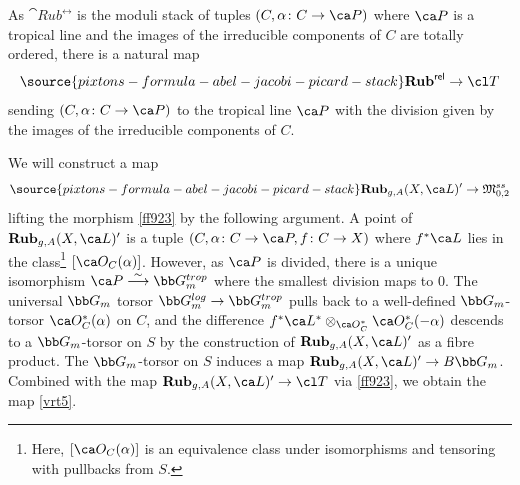 As $\cat{Rub}^{\rel}$ is the moduli stack of tuples $(C, \alpha\colon C \to \ca P)$ where $\ca P$ is a tropical line and the images of the irreducible components of $C$ are totally ordered, there is a natural map
\begin{equation}\label{ff923}
\source{pixtons-formula-abel-jacobi-picard-stack}
\cat{Rub}^{\rel} \to \cl T
\end{equation}
sending $(C, \alpha\colon C \to \ca P)$ to the tropical line $\ca P$ with the division given by the images of the irreducible components of $C$.


We will construct a map
 \begin{equation}\label{vrt5}
\source{pixtons-formula-abel-jacobi-picard-stack}
 \cat{Rub}_{g,A}(X, \ca L)'\to \frak M_{0,2}^{ss}
 \end{equation}
 lifting the  morphism \eqref{ff923} by the following argument.
A point of $\cat{Rub}_{g,A}(X, \ca L)'$ is a tuple $(C, \alpha\colon C \to \ca P, f\colon C \to X)$ where $f^*\ca L$ lies in the class{\footnote{Here,
$[\ca O_C(\alpha)]$
 is an equivalence class under isomorphisms and tensoring with pullbacks from $S$.
}}
$[\ca O_C(\alpha)]$.  However, as $\ca P$ is divided, there is a unique isomorphism $\ca P \isom \bb G_m^{trop}$ where the smallest division maps to $0$. The universal $\bb G_m$ torsor $\bb G_m^{log} \to \bb G_m^{trop}$ pulls back to a well-defined $\bb G_m$-torsor $\ca O_C^*(\alpha)$ on $C$, and the difference $f^*\ca L^* \otimes_{\ca O^*_C} \ca O^*_C(-\alpha)$ descends to a $\bb G_m$-torsor on $S$ by the construction of $\cat{Rub}_{g,A}(X, \ca L)'$ as a fibre product. The $\bb G_m$-torsor on $S$ induces a map $\cat{Rub}_{g,A}(X, \ca L)' \to B \bb G_m$. Combined with the map $\cat{Rub}_{g,A}(X, \ca L)' \to \cl T$ via \eqref{ff923},
we obtain the
map \eqref{vrt5}.



